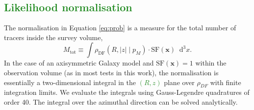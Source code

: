 \documentclass[iop,revtex4]{emulateapj}
\newcommand{\vect}[1]{\boldsymbol{#1}}
\newcommand*\Diff[1]{\mathop{}\!\mathrm{d^#1}}
\newcommand{\pmodel}{\ensuremath{p_M}}
\newcommand{\NEW}[1]{\textcolor{ForestGreen}{#1}}
\newcommand{\OLD}[1]{}
\begin{document}
\subsection{\NEW{Likelihood normalisation}}

The normalisation in Equation \eqref{eq:prob} is a measure for the total number of tracers inside the survey volume,
\begin{equation}
M_\text{tot} \equiv \int  \rho_\text{DF}(R,|z| \mid \pmodel) \cdot \text{SF}(\vect{x}) \Diff 3 x.\label{eq:normalisation}
\end{equation}
In the case of an axisymmetric Galaxy model and $\text{SF}(\vect{x})=1$ within the observation volume (as in most tests in this work), the normalisation is essentially a two-dimensional integral in the \NEW{$(R,z)$}\OLD{$R$-$z$} plane over $\rho_{DF}$ with finite integration limits. We evaluate the integrals using Gauss-Legendre quadratures of order 40. The integral over the azimuthal direction can be solved analytically. 
\end{document}
